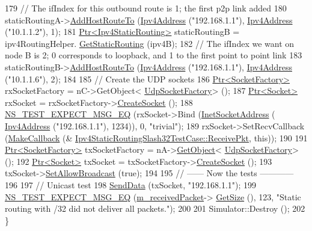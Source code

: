 \begin{DoxyCode}
179   \textcolor{comment}{// The ifIndex for this outbound route is 1; the first p2p link added}
180   staticRoutingA->\hyperlink{classns3_1_1Ipv4StaticRouting_ae96452233179689167e57b49b4339005}{AddHostRouteTo} (\hyperlink{classns3_1_1Ipv4Address}{Ipv4Address} (\textcolor{stringliteral}{"192.168.1.1"}), 
      \hyperlink{classns3_1_1Ipv4Address}{Ipv4Address} (\textcolor{stringliteral}{"10.1.1.2"}), 1);
181   \hyperlink{classns3_1_1Ptr}{Ptr<Ipv4StaticRouting>} staticRoutingB = ipv4RoutingHelper.
      \hyperlink{classns3_1_1Ipv4StaticRoutingHelper_a731206e50d305695dac7fb2ef963a4bb}{GetStaticRouting} (ipv4B);
182   \textcolor{comment}{// The ifIndex we want on node B is 2; 0 corresponds to loopback, and 1 to the first point to point link}
183   staticRoutingB->\hyperlink{classns3_1_1Ipv4StaticRouting_ae96452233179689167e57b49b4339005}{AddHostRouteTo} (\hyperlink{classns3_1_1Ipv4Address}{Ipv4Address} (\textcolor{stringliteral}{"192.168.1.1"}), 
      \hyperlink{classns3_1_1Ipv4Address}{Ipv4Address} (\textcolor{stringliteral}{"10.1.1.6"}), 2);
184 
185   \textcolor{comment}{// Create the UDP sockets}
186   \hyperlink{classns3_1_1Ptr}{Ptr<SocketFactory>} rxSocketFactory = nC->GetObject<
      \hyperlink{classns3_1_1UdpSocketFactory}{UdpSocketFactory}> ();
187   \hyperlink{classns3_1_1Ptr}{Ptr<Socket>} rxSocket = rxSocketFactory->\hyperlink{classns3_1_1SocketFactory_a97351e6e7860503a4912042530449f62}{CreateSocket} ();
188   \hyperlink{group__testing_ga7304ba46a28d8cf08dfdfd6499cf7068}{NS\_TEST\_EXPECT\_MSG\_EQ} (rxSocket->Bind (\hyperlink{classns3_1_1InetSocketAddress}{InetSocketAddress} (
      \hyperlink{classns3_1_1Ipv4Address}{Ipv4Address} (\textcolor{stringliteral}{"192.168.1.1"}), 1234)), 0, \textcolor{stringliteral}{"trivial"});
189   rxSocket->SetRecvCallback (\hyperlink{group__makecallbackmemptr_ga9376283685aa99d204048d6a4b7610a4}{MakeCallback} (&
      \hyperlink{classIpv4StaticRoutingSlash32TestCase_a50319504994176603f9c117f815e82aa}{Ipv4StaticRoutingSlash32TestCase::ReceivePkt}, \textcolor{keyword}{this}));
190 
191   \hyperlink{classns3_1_1Ptr}{Ptr<SocketFactory>} txSocketFactory = nA->\hyperlink{classns3_1_1Object_a13e18c00017096c8381eb651d5bd0783}{GetObject}<
      \hyperlink{classns3_1_1UdpSocketFactory}{UdpSocketFactory}> ();
192   \hyperlink{classns3_1_1Ptr}{Ptr<Socket>} txSocket = txSocketFactory->\hyperlink{classns3_1_1SocketFactory_a97351e6e7860503a4912042530449f62}{CreateSocket} ();
193   txSocket->\hyperlink{classns3_1_1Socket_a32b4fa27b732a63207c8d9054a817ed5}{SetAllowBroadcast} (\textcolor{keyword}{true});
194 
195   \textcolor{comment}{// ------ Now the tests ------------}
196 
197   \textcolor{comment}{// Unicast test}
198   \hyperlink{classIpv4StaticRoutingSlash32TestCase_a172a790340fdce3fef1e07e5e35b2e8a}{SendData} (txSocket, \textcolor{stringliteral}{"192.168.1.1"});
199   \hyperlink{group__testing_ga7304ba46a28d8cf08dfdfd6499cf7068}{NS\_TEST\_EXPECT\_MSG\_EQ} (\hyperlink{classIpv4StaticRoutingSlash32TestCase_aaf03ac38a3bf02e523e19255b641f1d4}{m\_receivedPacket}->
      \hyperlink{classns3_1_1Packet_a462855c9929954d4301a4edfe55f4f1c}{GetSize} (), 123, \textcolor{stringliteral}{"Static routing with /32 did not deliver all packets."});
200 
201   Simulator::Destroy ();
202 \}
\end{DoxyCode}


